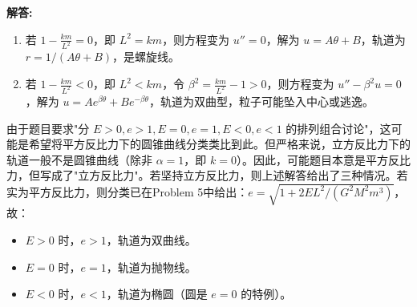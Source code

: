 \documentclass[12pt, a4paper, oneside]{ctexart}
\newenvironment{solution}{\par\noindent\textbf{解答:}\quad}{\par}
\begin{document}
\begin{solution}
\begin{enumerate}
        \item 若 \(1 - \frac{k m}{L^2} = 0\)，即 \(L^2 = k m\)，则方程变为 \(u'' = 0\)，解为 \(u = A \theta + B\)，轨道为 \(r = 1/(A\theta + B)\)，是螺旋线。
        
        \item 若 \(1 - \frac{k m}{L^2} < 0\)，即 \(L^2 < k m\)，令 \(\beta^2 = \frac{k m}{L^2} - 1 > 0\)，则方程变为 \(u'' - \beta^2 u = 0\)，解为 \(u = A e^{\beta \theta} + B e^{-\beta \theta}\)，轨道为双曲型，粒子可能坠入中心或逃逸。
    \end{enumerate}
    
    由于题目要求"分 \(E>0, e>1, E=0, e=1, E<0, e<1\) 的排列组合讨论"，这可能是希望将平方反比力下的圆锥曲线分类类比到此。但严格来说，立方反比力下的轨道一般不是圆锥曲线（除非 \(\alpha=1\)，即 \(k=0\)）。因此，可能题目本意是平方反比力，但写成了"立方反比力"。若坚持立方反比力，则上述解答给出了三种情况。若实为平方反比力，则分类已在Problem 5中给出：\(e= \sqrt{1+2EL^2/(G^2M^2m^3)}\)，故：
    \begin{itemize}
        \item \(E > 0\) 时，\(e > 1\)，轨道为双曲线。
        \item \(E = 0\) 时，\(e = 1\)，轨道为抛物线。
        \item \(E < 0\) 时，\(e < 1\)，轨道为椭圆（圆是 \(e=0\) 的特例）。
    \end{itemize}
\end{solution}
\end{document}
